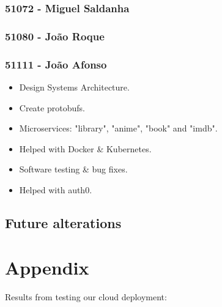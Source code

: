 \documentclass[oneside]{article}
\newcommand*\fpar{\hspace{1ex}}
\begin{document}
    \subsubsection{51072 - Miguel Saldanha}
    \subsubsection{51080 - João Roque}
    \subsubsection{51111 - João Afonso}
        \begin{itemize}
        	\item Design Systems Architecture.
        	\item Create protobufs.
        	\item Microservices: "library", "anime", "book" and "imdb".
        	\item Helped with Docker \& Kubernetes.
       		\item Software testing \& bug fixes.
        	\item Helped with auth0.
      	\end{itemize}

  \subsection{Future alterations}
  \label{sec:alterations}

\section{Appendix}
\label{appendix}

\fpar Results from testing our cloud deployment:
\end{document}
